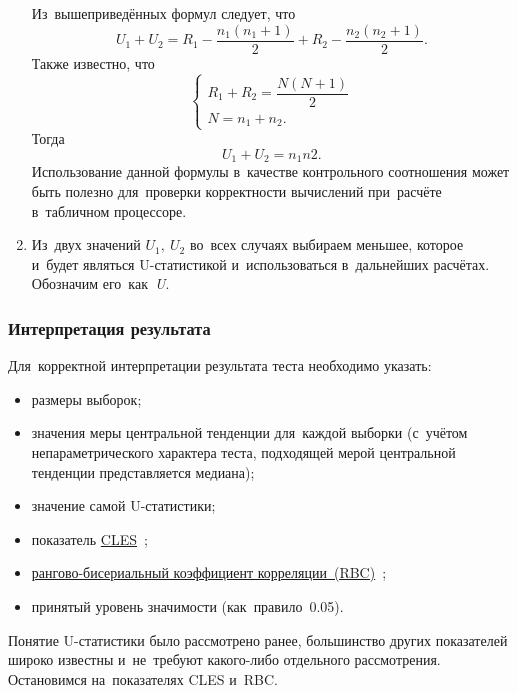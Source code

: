 \documentclass[]{scrartcl}
\begin{document}
\begin{enumerate}
	Из~вышеприведённых формул следует, что
	\begin{equation}\label{eq:U1-U2-relation}
	U_{1}+U_{2} = R_{1}-\frac{n_{1}(n_{1}+1)}{2} + R_{2}-\frac{n_{2}(n_{2}+1)}{2}.
	\end{equation}
	Также известно, что
	\begin{equation}\label{eq:R-N-relation}
	\begin{cases}
	R_{1}+R_{2}=\dfrac{N(N+1)}{2}\\
	N=n_{1}+n_{2}.
	\end{cases}
	\end{equation}
	Тогда
	\begin{equation}\label{eq:check-U-value}
	U_{1}+U_{2}=n_{1}n{2}.
	\end{equation}
	Использование данной формулы в~качестве контрольного соотношения может быть полезно для~проверки корректности вычислений при~расчёте в~табличном процессоре.
	\item Из~двух значений ${\textstyle U_{1},\ U_{2}}$ во~всех случаях выбираем меньшее, которое и~будет являться U-статистикой и~использоваться в~дальнейших расчётах. Обозначим его~как~\textit{U}.
\end{enumerate}
\subsubsection{Интерпретация результата}
Для~корректной интерпретации результата теста необходимо указать:
\begin{itemize}
	\item размеры выборок;
	\item значения меры центральной тенденции для~каждой выборки (с~учётом непараметрического характера теста, подходящей мерой центральной тенденции представляется медиана);
	\item значение самой U-статистики;
	\item показатель \href{https://en.wikipedia.org/wiki/Effect_size#Common_language_effect_size}{CLES}~\cite{Wiki:CLES};
	\item \href{https://en.wikipedia.org/wiki/Effect_size#Rank-biserial_correlation}{рангово-бисериальный коэффициент корреляции~(RBC)}~\cite{Wiki:rank-biserial-correlation};
	\item принятый уровень значимости (как~правило~0.05).
\end{itemize}
Понятие U-статистики было рассмотрено ранее, большинство других показателей широко известны и~не~требуют какого-либо отдельного рассмотрения. Остановимся на~показателях CLES и~RBC.
\end{document}
